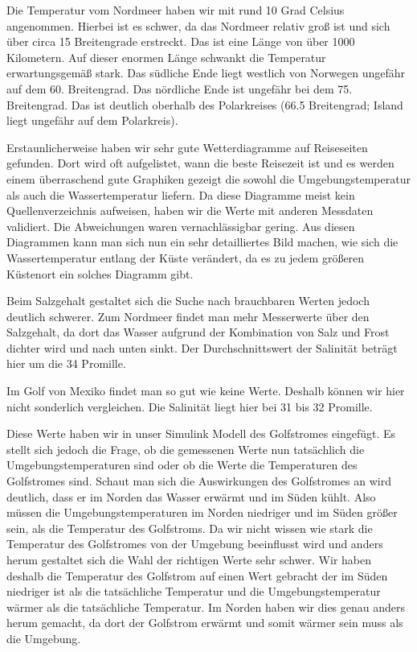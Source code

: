\documentclass[a4paper,twoside]{article}
\begin{document}
	Die Temperatur vom Nordmeer haben wir mit rund 10 Grad Celsius angenommen. Hierbei ist es schwer, da das Nordmeer relativ groß ist und sich über circa 15 Breitengrade erstreckt. Das ist eine Länge von über 1000 Kilometern. Auf dieser enormen Länge schwankt die Temperatur erwartungsgemäß stark. Das südliche Ende liegt westlich von Norwegen ungefähr auf dem 60. Breitengrad. Das nördliche Ende ist ungefähr bei dem 75. Breitengrad. Das ist deutlich oberhalb des Polarkreises (66.5 Breitengrad; Island liegt ungefähr auf dem Polarkreis).

	Erstaunlicherweise haben wir sehr gute Wetterdiagramme auf Reiseseiten gefunden. Dort wird oft aufgelistet, wann die beste Reisezeit ist und es werden einem überraschend gute Graphiken gezeigt die sowohl die Umgebungstemperatur als auch die Wassertemperatur liefern. Da diese Diagramme meist kein Quellenverzeichnis aufweisen, haben wir die Werte mit anderen Messdaten validiert. Die Abweichungen waren vernachlässigbar gering. Aus diesen Diagrammen kann man sich nun ein sehr detailliertes Bild machen, wie sich die Wassertemperatur entlang der Küste verändert, da es zu jedem größeren Küstenort ein solches Diagramm gibt.

	Beim Salzgehalt gestaltet sich die Suche nach brauchbaren Werten jedoch deutlich schwerer. Zum Nordmeer findet man mehr Messerwerte über den Salzgehalt, da dort das Wasser aufgrund der Kombination von Salz und Frost dichter wird und nach unten sinkt. Der Durchschnittswert der Salinität beträgt hier um die 34 Promille. 

	Im Golf von Mexiko findet man so gut wie keine Werte. Deshalb können wir hier nicht sonderlich vergleichen. Die Salinität liegt hier bei 31 bis 32 Promille.

	Diese Werte haben wir in unser Simulink Modell des Golfstromes eingefügt. Es stellt sich jedoch die Frage, ob die gemessenen Werte nun tatsächlich die Umgebungstemperaturen sind oder ob die Werte die Temperaturen des Golfstromes sind. Schaut man sich die Auswirkungen des Golfstromes an wird deutlich, dass er im Norden das Wasser erwärmt und im Süden kühlt. Also müssen die Umgebungstemperaturen im Norden niedriger und im Süden größer sein, als die Temperatur des Golfstroms. Da wir nicht wissen wie stark die Temperatur des Golfstromes von der Umgebung beeinflusst wird und anders herum gestaltet sich die Wahl der richtigen Werte sehr schwer. Wir haben deshalb die Temperatur des Golfstrom auf einen Wert gebracht der im Süden niedriger ist als die tatsächliche Temperatur und die Umgebungstemperatur wärmer als die tatsächliche Temperatur. Im Norden haben wir dies genau anders herum gemacht, da dort der Golfstrom erwärmt und somit wärmer sein muss als die Umgebung.
	
\end{document}
